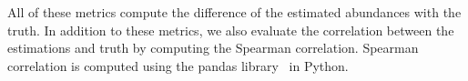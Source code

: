 All of these metrics compute the difference of the estimated abundances 
with the truth. In addition to these metrics, we also evaluate the 
correlation between the estimations and truth by computing the 
Spearman correlation. Spearman correlation is computed using the 
pandas library~\citep{reback2020pandas} in Python.










